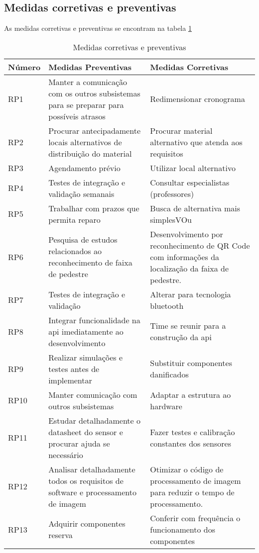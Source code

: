 \subsection{Medidas corretivas e preventivas}

As medidas corretivas e preventivas se encontram na tabela \ref{medidas}

\begin{table}[ht]
    \centering
    \caption{Medidas corretivas e preventivas} \label{medidas}
    \begin{tabular}{p{0.5in}p{2.3in}p{2.3in}}
    Número & Medidas Preventivas & Medidas Corretivas \\ \hline
    RP1 & Manter a comunicação com os outros subsistemas para se preparar para possíveis atrasos & Redimensionar cronograma \\ \hline
    RP2 & Procurar antecipadamente locais alternativos de distribuição do material & Procurar material alternativo que atenda aos requisitos\\ \hline
    RP3 & Agendamento prévio & Utilizar local alternativo\\ \hline
    RP4 & Testes de integração e validação semanais & Consultar especialistas (professores) \\ \hline
    RP5 & Trabalhar com prazos que permita reparo & Busca de alternativa mais simplesVOu \\ \hline
    RP6 & Pesquisa de estudos relacionados ao reconhecimento de faixa de pedestre & Desenvolvimento por reconhecimento de QR Code com informações da localização da faixa de pedestre. \\ \hline
    RP7 & Testes de integração e validação & Alterar para tecnologia bluetooth \\ \hline
    RP8 & Integrar funcionalidade na api imediatamente ao desenvolvimento & Time se reunir para a construção da api \\ \hline
    RP9 & Realizar simulações e testes antes de implementar & Substituir componentes danificados \\ \hline
    RP10 & Manter comunicação com outros subsistemas  & Adaptar a estrutura ao hardware \\ \hline
    RP11 & Estudar detalhadamente o datasheet do sensor e procurar ajuda se necessário  & Fazer testes e calibração constantes dos sensores  \\ \hline
    RP12 & Analisar detalhadamente todos os requisitos de software e processamento de imagem & Otimizar o código de processamento de imagem para reduzir o tempo de processamento.  \\ \hline
    RP13 & Adquirir componentes reserva & Conferir com frequência o funcionamento dos componentes  \\ \hline
    \end{tabular}
\end{table}